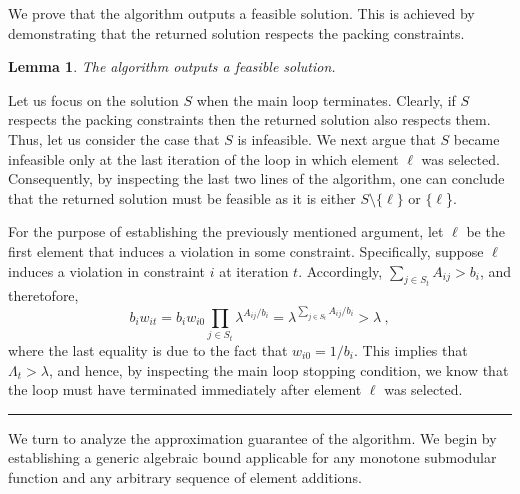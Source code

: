 \documentclass[11pt]{article}
\theoremstyle{plain}
\newtheorem{lemma}[theorem]{Lemma}
\theoremstyle{definition}
\newcommand{\qedsymb}{\hfill{\rule{2mm}{2mm}}}
\renewenvironment{proof}{\begin{trivlist} \item[\hspace{\labelsep}{\bf \noindent Proof.\/}] }{\qedsymb\end{trivlist}}\newenvironment{proofof}[1]{\begin{trivlist} \item[\hspace{\labelsep}{\bf \noindent Proof of #1.\/}] }{\qedsymb\end{trivlist}}\newenvironment{MyEqn}[1]{\setlength\arraycolsep{2pt}\begin{eqnarray*} #1}{\end{eqnarray*}}
\begin{document}
\smallskip {}
We prove that the algorithm outputs a feasible solution. This is
achieved by demonstrating that the returned solution respects the
packing constraints.

\begin{lemma} \label{lemma:Feasibility}
The algorithm outputs a feasible solution.
\end{lemma}
\begin{proof}
Let us focus on the solution $S$ when the main loop terminates.
Clearly, if $S$ respects the packing constraints then the returned
solution also respects them. Thus, let us consider the case that
$S$ is infeasible. We next argue that $S$ became infeasible only
at the last iteration of the loop in which element $\ell$ was
selected. Consequently, by inspecting the last two lines of the
algorithm, one can conclude that the returned solution must be
feasible as it is either $S \setminus \{\ell\}$ or $\{\ell$\}.

For the purpose of establishing the previously mentioned argument,
let $\ell$ be the first element that induces a violation in some
constraint. Specifically, suppose $\ell$ induces a violation in
constraint $i$ at iteration $t$. Accordingly, $\sum_{j \in S_t}
A_{ij} > b_i$, and theretofore,
$$
b_i w_{it} = b_i w_{i0} \prod_{j \in S_t} \lambda^{A_{ij} / b_i} =
\lambda^{\sum_{j \in S_t} A_{ij} / b_i}
> \lambda \ ,
$$
where the last equality is due to the fact that $w_{i0} = 1 /
b_i$. This implies that $\Lambda_t > \lambda$, and hence, by
inspecting the main loop stopping condition, we know that the loop
must have terminated immediately after element $\ell$ was
selected.~
\end{proof}


\smallskip {}
We turn to analyze the approximation guarantee of the algorithm.
We begin by establishing a generic algebraic bound applicable for
any monotone submodular function and any arbitrary sequence of
element additions.
\end{document}

